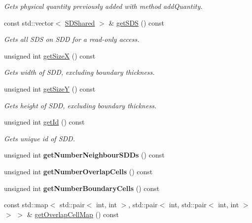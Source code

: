 \begin{DoxyCompactItemize}
\begin{DoxyCompactList}\small\item\em Gets physical quantity previously added with method add\+Quantity. \end{DoxyCompactList}\item 
const std\+::vector$<$ \hyperlink{classSDShared}{S\+D\+Shared} $>$ \& \hyperlink{classSDDistributed_a9afba0607b6012a0e446b95251559f5d}{get\+S\+DS} () const
\begin{DoxyCompactList}\small\item\em Gets all S\+DS on S\+DD for a read-\/only access. \end{DoxyCompactList}\item 
unsigned int \hyperlink{classSDDistributed_a567b9535558271515166ce7ebd3f6c29}{get\+SizeX} () const
\begin{DoxyCompactList}\small\item\em Gets width of S\+DD, excluding boundary thickness. \end{DoxyCompactList}\item 
unsigned int \hyperlink{classSDDistributed_a9bf0049f4c95513b4d9c9a9bac0f6eb4}{get\+SizeY} () const
\begin{DoxyCompactList}\small\item\em Gets height of S\+DD, excluding boundary thickness. \end{DoxyCompactList}\item 
unsigned int \hyperlink{classSDDistributed_a0ab71d942dca319b739390055942a96a}{get\+Id} () const
\begin{DoxyCompactList}\small\item\em Gets unique id of S\+DD. \end{DoxyCompactList}\item 
\mbox{\label{classSDDistributed_a8a7bf55ebead74e2c234fe21ebc02475}} 
unsigned int {\bfseries get\+Number\+Neighbour\+S\+D\+Ds} () const
\item 
\mbox{\label{classSDDistributed_a9fe968b07308e670e2bc53597d2d139f}} 
unsigned int {\bfseries get\+Number\+Overlap\+Cells} () const
\item 
\mbox{\label{classSDDistributed_ad8247f4958820ef02d97e22059ee7f94}} 
unsigned int {\bfseries get\+Number\+Boundary\+Cells} () const
\item 
const std\+::map$<$ std\+::pair$<$ int, int $>$, std\+::pair$<$ int, std\+::pair$<$ int, int $>$ $>$ $>$ \& \hyperlink{classSDDistributed_a5ca6adae6bc3b93f937a633f8813fed0}{get\+Overlap\+Cell\+Map} () const

\end{DoxyCompactItemize}

